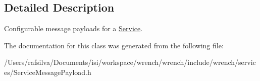 \subsection{Detailed Description}
Configurable message payloads for a \hyperlink{classwrench_1_1_service}{Service}. 

The documentation for this class was generated from the following file\+:\begin{DoxyCompactItemize}
\item 
/\+Users/rafsilva/\+Documents/isi/workspace/wrench/wrench/include/wrench/services/Service\+Message\+Payload.\+h\end{DoxyCompactItemize}
